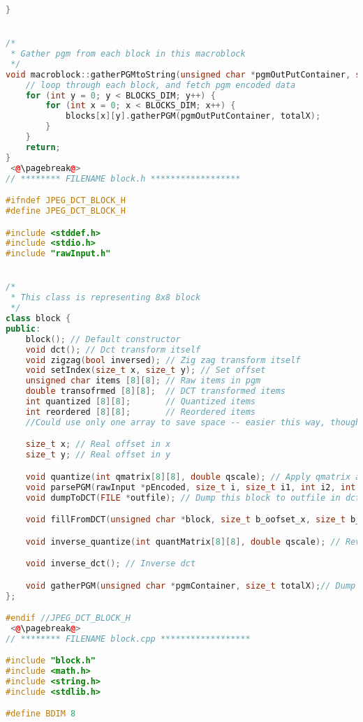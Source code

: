 \documentclass{report}
\begin{document}
\begin{lstlisting}[language=C++]
}


/*
 * Gather pgm from each block in this macroblock
 */
void macroblock::gatherPGMtoString(unsigned char *pgmOutPutContainer, size_t totalX) {
    // loop through each block, and fetch pgm encoded data
    for (int y = 0; y < BLOCKS_DIM; y++) {
        for (int x = 0; x < BLOCKS_DIM; x++) {
            blocks[x][y].gatherPGM(pgmOutPutContainer, totalX);
        }
    }
    return;
}
 <@\pagebreak@>
// ******** FILENAME block.h ******************

#ifndef JPEG_DCT_BLOCK_H
#define JPEG_DCT_BLOCK_H

#include <stddef.h>
#include <stdio.h>
#include "rawInput.h"


/*
 * This class is representing 8x8 block
 */
class block {
public:
    block(); // Default constructor
    void dct(); // Dct transform itself
    void zigzag(bool inversed); // Zig zag transform itself
    void setIndex(size_t x, size_t y); // Set offset
    unsigned char items [8][8]; // Raw items in pgm
    double transofrmed [8][8];  // DCT transformed items
    int quantized [8][8];       // Quantized items
    int reordered [8][8];       // Reordered items
    //Could use only one array to save space -- easier this way, though less efficient.

    size_t x; // Real offset in x
    size_t y; // Real offset in y

    void quantize(int qmatrix[8][8], double qscale); // Apply qmatrix and qscale to this block
    void parsePGM(rawInput *pEncoded, size_t i, size_t i1, int i2, int i3, size_t total_x); // parse pgm formatted string
    void dumpToDCT(FILE *outfile); // Dump this block to outfile in dct format

    void fillFromDCT(unsigned char *block, size_t b_oofset_x, size_t b_offset_y); // parse dct formatted string

    void inverse_quantize(int quantMatrix[8][8], double qscale); // Reverse quantization

    void inverse_dct(); // Inverse dct

    void gatherPGM(unsigned char *pgmContainer, size_t totalX);// Dump this block in pgm format into pgm formatted string
};

#endif //JPEG_DCT_BLOCK_H
 <@\pagebreak@>
// ******** FILENAME block.cpp ******************

#include "block.h"
#include <math.h>
#include <string.h>
#include <stdlib.h>

#define BDIM 8


\end{lstlisting}
\end{document}
